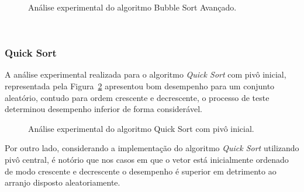 \documentclass[conference]{IEEEtran}
\begin{document}
\begin{figure}

\caption{Análise experimental do algoritmo Bubble Sort Avançado.}
\label{image: graph-bubble-adv}
\end{figure}

~\\
\subsubsection{Quick Sort}
A análise experimental realizada para o algoritmo \textit{Quick Sort} com pivô inicial, representada pela Figura~\ref{image: graph-quick-inicial} apresentou bom desempenho para um conjunto aleatório, contudo para ordem crescente e decrescente, o processo de teste determinou desempenho inferior de forma considerável.

\begin{figure}


\caption{Análise experimental do algoritmo Quick Sort com pivô inicial.}
\label{image: graph-quick-inicial}
\end{figure}


Por outro lado, considerando a implementação do algoritmo \textit{Quick Sort} utilizando pivô central, é notório que nos casos em que o vetor está inicialmente ordenado de modo crescente e decrescente o desempenho é superior em detrimento ao arranjo  disposto aleatoriamente. 
\end{document}

